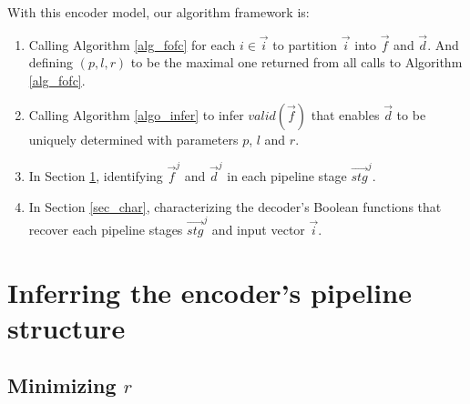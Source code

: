 \documentclass[conference]{IEEEtran}
\begin{document}




With this encoder model,
our algorithm framework is:

\begin{enumerate}
 \item Calling Algorithm \ref{alg_fofc} for each $i\in\vec{i}$ to partition $\vec{i}$ into $\vec{f}$ and $\vec{d}$.
 And defining $(p,l,r)$ to be the maximal one  returned from all calls to Algorithm \ref{alg_fofc}.
 \item Calling Algorithm \ref{algo_infer} to infer $valid(\vec{f})$ that enables $\vec{d}$ 
 to be uniquely determined with parameters $p$, $l$ and $r$.
 \item In Section \ref{sec_pipeinfer}, 
 identifying $\vec{f}^j$ and $\vec{d}^j$ in each pipeline stage $\vec{stg}^j$. 
 \item In Section \ref{sec_char}, 
 characterizing the decoder's Boolean functions that recover each pipeline stages $\vec{stg}^j$
 and input vector $\vec{i}$.
\end{enumerate}



\section{Inferring the encoder's pipeline structure}\label{sec_pipeinfer}


\subsection{Minimizing $r$}\label{reduceing}
\end{document}
